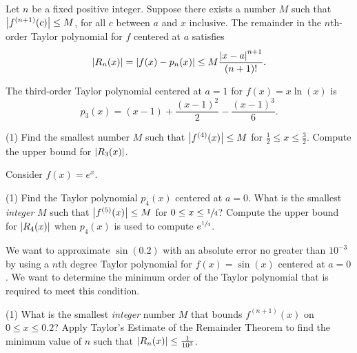 \documentclass[../mathNotesPreamble]{subfiles}
\begin{document}
  \begin{thmBox*}
    Let $n$ be a fixed positive integer. Suppose there exists a number $M$ such that ${\left\vert f^{(n+1)}(c)\right\vert}\leq M$, for all $c$ between $a$ and $x$ inclusive. The remainder in the $n$th-order Taylor polynomial for $f$ centered at $a$ satisfies
      \[{\left\vert R_n(x)\right\vert}={\left\vert f(x)-p_n(x)\right\vert}\leq M\frac{{\left\vert x-a\right\vert}^{n+1}}{(n+1)!}.\]
  
  \end{thmBox*}
  \pagebreak

  \begin{ex*}[\textcolor{blue}{LC 27.1-27.2}]
    The third-order Taylor polynomial centered at $a=1$ for $f(x)=x\ln(x)$ is
      \[p_3(x)=(x-1)+\frac{(x-1)^2}{2}-\frac{(x-1)^3}{6}.\]
  \end{ex*}
  \begin{tasks}[after-item-skip=\stretch{1}, label=,item-indent=0pt](1)
    \task Find the smallest number $M$ such that ${\left\vert f^{(4)}(x)\right\vert}\leq M$ for $\frac{1}{2}\leq x\leq \frac{3}{2}.$
    \task Compute the upper bound for ${\left\vert R_3(x)\right\vert}$.
  \end{tasks}
  \pagebreak

  \begin{ex*}[\textcolor{blue}{LC 27.3-27.5}]
    Consider $f(x)=e^x$.
  \end{ex*}
  \begin{tasks}[after-item-skip=\stretch{1}, label=,item-indent=0pt](1)
    \task Find the Taylor polynomial $p_4(x)$ centered at $a=0$.
    \task What is the smallest \textit{integer} $M$ such that ${\left\vert f^{(5)}(x)\right\vert}\leq M$ for $0\leq x\leq \sfrac{1}{4}$?
    \task Compute the upper bound for ${\left\vert R_4(x)\right\vert}$ when $p_4(x)$ is used to compute $e^{\sfrac{1}{4}}$.
  \end{tasks}
  \pagebreak

  \begin{ex*}[\textcolor{blue}{LC 27.6-27.7}]
    We want to approximate $\sin(0.2)$ with an absolute error no greater than $10^{-3}$ by using a $n$th degree Taylor polynomial for $f(x)=\sin(x)$ centered at $a=0$. We want to determine the minimum order of the Taylor polynomial that is required to meet this condition.
  \end{ex*}
  \begin{tasks}[after-item-skip=\stretch{1}, label=,item-indent=0pt](1)
    \task 
      What is the smallest \textit{integer} number $M$ that bounds $f^{(n+1)}(x)$ on $0\leq x\leq 0.2$?
    \task 
      Apply Taylor's Estimate of the Remainder Theorem to find the minimum value of $n$ such that ${\left\vert R_n(x)\right\vert}\leq \frac{1}{10^3}$.
  \end{tasks}
  \pagebreak
\end{document}
